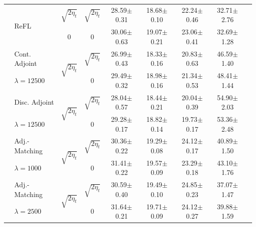 \documentclass[]{fairmeta}
\begin{document}
\begin{table}[t]
\begin{tabular}{llccccccc}
    \\
    \addlinespace
    & \multirow{2}{*}{ReFL}              & $\sqrt{2 \eta_t}$ & $\sqrt{2 \eta_t}$ & 28.59{\tiny$\pm$0.31} & 18.68{\tiny$\pm$0.10} & 22.24{\tiny$\pm$0.46} & 32.71{\tiny$\pm$2.76} 
    \\
    &                                   & 0                 & 0                 & 30.06{\tiny$\pm$0.63} & 19.07{\tiny$\pm$0.21} & 23.06{\tiny$\pm$0.41} & 32.69{\tiny$\pm$1.28} 
    \\
    \midrule %
    \parbox[t]{2mm}{} 
    & Cont. Adjoint &  & $\sqrt{2 \eta_t}$ & 26.99{\tiny$\pm$0.43} & 18.33{\tiny$\pm$0.16} & 20.83{\tiny$\pm$0.63} & 46.59{\tiny$\pm$1.40} 
    \\
    & $\lambda = 12500$                     &                                    & 0                 & 29.49{\tiny$\pm$0.32} & 18.98{\tiny$\pm$0.16} & 21.34{\tiny$\pm$0.53} & 48.41{\tiny$\pm$1.44} 
    \\
    \addlinespace
    & Disc. Adjoint &  & $\sqrt{2 \eta_t}$ & 28.04{\tiny$\pm$0.57} & 18.44{\tiny$\pm$0.21} & 20.04{\tiny$\pm$0.39} & 54.90{\tiny$\pm$2.03} 
    \\
    & $\lambda = 12500$                    &                                    & 0                 & 29.28{\tiny$\pm$0.17} & 18.82{\tiny$\pm$0.14} & 19.73{\tiny$\pm$0.17} & 53.36{\tiny$\pm$2.48} 
    \\
    \addlinespace
    \addlinespace
    & Adj.-Matching  &  & $\sqrt{2 \eta_t}$ & 30.36{\tiny$\pm$0.22} & 19.29{\tiny$\pm$0.08} & 24.12{\tiny$\pm$0.17} & 40.89{\tiny$\pm$1.50} 
    \\
    & $\lambda = 1000$                     &                                    & 0                 & 31.41{\tiny$\pm$0.22} & 19.57{\tiny$\pm$0.09} & 23.29{\tiny$\pm$0.18} & 43.10{\tiny$\pm$1.76} 
    \\
    \addlinespace
    & Adj.-Matching &  & $\sqrt{2 \eta_t}$ & 30.59{\tiny$\pm$0.40} & 19.49{\tiny$\pm$0.10} & 24.85{\tiny$\pm$0.23} & 37.07{\tiny$\pm$1.47} 
    \\
    & $\lambda = 2500$                     &                                    & 0                 & 31.64{\tiny$\pm$0.21} & 19.71{\tiny$\pm$0.09} & 24.12{\tiny$\pm$0.27} & 39.88{\tiny$\pm$1.59} 

\end{tabular}
\end{table}
\end{document}

